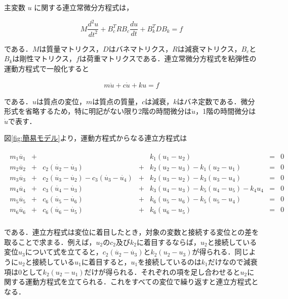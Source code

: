 主変数 $u$ に関する連立常微分方程式は，

\begin{equation}
    M \frac{d^2 u}{dt^2} + B_c^T R B_c \frac{du}{dt} + B_k^T D B_k = f    
\end{equation}

である．$M$は質量マトリクス，$D$はバネマトリクス，$R$は減衰マトリクス，$B_c$と$B_k$は剛性マトリクス，$f$は荷重マトリクスである．連立常微分方程式を粘弾性の運動方程式で一般化すると

\begin{eqnarray}
    m\ddot{u} + c\dot{u} + ku = f
\end{eqnarray}

である．$u$は質点の変位，$m$は質点の質量，$c$は減衰，$k$はバネ定数である．微分形式を省略するため，特に明記がない限り2階の時間微分は$\ddot{u}$，1階の時間微分は$\dot{u}$で表す．

図\ref{fig:簡易モデル}より，運動方程式からなる連立方程式は

\begin{eqnarray}
    \begin{matrix}
        m_1 \ddot{u_1} &+&  & & k_1 (u_1 - u_2) &=& 0 \\ 
        m_2 \ddot{u_2} &+& c_2(\dot{u_2} - \dot{u_3}) &+& k_2 (u_2 - u_3) - k_1 (u_2 - u_1) &=& 0 \\ 
        m_3 \ddot{u_3} &+& c_2(\dot{u_3} - \dot{u_2}) - c_3(\dot{u_3} - \dot{u_4}) &+& k_2 (u_3 - u_2) - k_3 (u_3 - u_4) &=& 0 \\ 
        m_4 \ddot{u_4} &+& c_3(\dot{u_4} - \dot{u_3}) &+& k_3 (u_4 - u_3) - k_5 (u_4 - u_5) - k_4 u_4 &=& 0 \\ 
        m_5 \ddot{u_5} &+& c_6(\dot{u_5} - \dot{u_6}) &+& k_6 (u_5 - u_6) - k_5 (u_5 - u_4) &=& 0 \\
        m_6 \ddot{u_6} &+& c_6(\dot{u_6} - \dot{u_5}) &+& k_6 (u_6 - u_5) &=& 0 \\
    \end{matrix}        
\end{eqnarray}

である．連立方程式は変位に着目したとき，対象の変数と接続する変位との差を取ることで求まる．例えば，$u_2$の$c_2$及び$k_2$に着目するならば，$u_2$と接続している変位$u_3$について式を立てると，$c_2(\dot{u_2} - \dot{u_3})$と$k_2(u_2 - u_3)$が得られる．同じように$u_2$と接続している$u_1$に着目すると，$u_1$を接続しているのは$k_1$だけなので減衰項は$0$として$k_2(u_2 - u_1)$だけが得られる．それぞれの項を足し合わせると$u_2$に関する運動方程式を立てられる．これをすべての変位で繰り返すと連立方程式となる．


